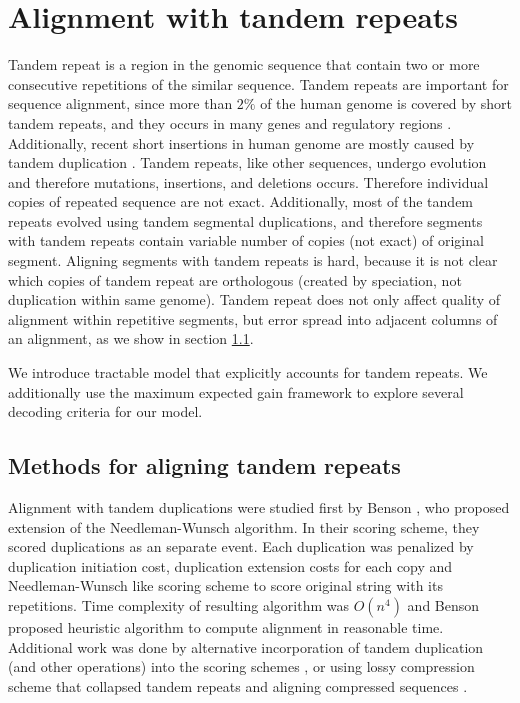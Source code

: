 \chapter{Alignment with tandem repeats}

Tandem repeat is a region in the genomic sequence that contain two or more
consecutive repetitions of the similar sequence.  Tandem repeats are important
for sequence alignment, since more than $2\%$ of the human genome is covered by
short tandem repeats, and they occurs in many genes and regulatory regions
\cite{Gemayel2010}. Additionally, recent short insertions in human genome are
mostly caused by tandem duplication \cite{Messer2007}.  Tandem repeats, like
other sequences, undergo evolution and therefore mutations, insertions, and
deletions occurs. Therefore individual copies of repeated sequence are not
exact.  Additionally, most of the tandem repeats evolved using tandem segmental
duplications, and therefore segments with tandem repeats contain variable
number of copies (not exact) of original segment. Aligning segments with tandem
repeats is hard, because it is not clear which copies of tandem repeat are
orthologous (created by speciation, not duplication within same genome).
Tandem repeat does not only affect quality of alignment within repetitive
segments, but error spread into adjacent columns of an alignment, as we show in
section \ref{}.  

We introduce tractable model that explicitly accounts for tandem repeats. We
additionally use the maximum expected gain framework to explore several decoding
criteria for our model.



\section{Methods for aligning tandem repeats}

Alignment with tandem duplications were studied first by Benson
\cite{Benson1997}, who proposed extension of the Needleman-Wunsch
algorithm. In their scoring scheme, they scored duplications as an separate
event. Each duplication was penalized by duplication initiation cost,
duplication extension costs for each copy and Needleman-Wunsch like scoring
scheme to score original string with its repetitions. Time complexity of
resulting algorithm was $O(n^4)$ and Benson proposed heuristic algorithm to
compute alignment in reasonable time.  Additional work was done by alternative incorporation of
tandem duplication (and other operations) into the scoring schemes
\cite{Sammeth2006, Berard2006, Freschi2012}, or using lossy compression scheme
that collapsed tandem repeats and aligning compressed sequences
\cite{Freschi2012}.

